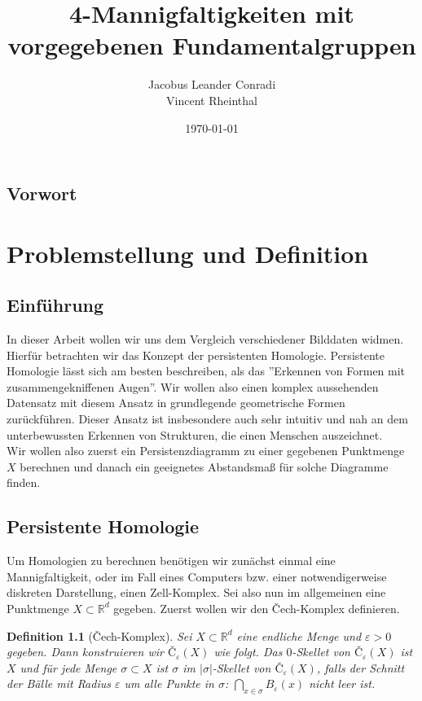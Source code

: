 \documentclass[11pt, a4paper,draft]{report}
\author{Jacobus Leander Conradi\\Vincent Rheinthal}
\date{\today}
\title{4-Mannigfaltigkeiten mit vorgegebenen Fundamentalgruppen}
\newtheorem{definition}{Definition}
\newcommand{\bR}{\mathbb{R}}
\begin{document}
 
	\maketitle
	
	\thispagestyle{plain}
	\section*{Vorwort}
	
	\newpage
	\clearpage
	\thispagestyle{empty}\mbox{}
	\newpage
	\addtocounter{page}{-1}
	\tableofcontents 
	\vfil\null
	\clearpage
	\thispagestyle{empty}\mbox{}
	\clearpage
	
	\chapter{Problemstellung und Definition}
	\section{Einführung}
	In dieser Arbeit wollen wir uns dem Vergleich verschiedener Bilddaten widmen. Hierfür betrachten wir das Konzept der persistenten Homologie. Persistente Homologie lässt sich am besten beschreiben, als das ''Erkennen von Formen mit zusammengekniffenen Augen''. Wir wollen also einen komplex aussehenden Datensatz mit diesem Ansatz in grundlegende geometrische Formen zurückführen. Dieser Ansatz ist insbesondere auch sehr intuitiv und nah an dem unterbewussten Erkennen von Strukturen, die einen Menschen auszeichnet.\\
	Wir wollen also zuerst ein Persistenzdiagramm zu einer gegebenen Punktmenge $X$ berechnen und danach ein geeignetes Abstandsmaß für solche Diagramme finden.
	
	\section{Persistente Homologie}
	
	Um Homologien zu berechnen benötigen wir zunächst einmal eine Mannigfaltigkeit, oder im Fall eines Computers bzw. einer notwendigerweise diskreten Darstellung, einen Zell-Komplex. Sei also nun im allgemeinen eine Punktmenge $X\subset \bR^d$ gegeben. Zuerst wollen wir den Čech-Komplex definieren.
	
	\begin{definition}[Čech-Komplex]
		Sei $X\subset \bR^d$ eine endliche Menge und $\varepsilon>0$ gegeben. Dann konstruieren wir $Č_\varepsilon(X)$ wie folgt. Das $0$-Skellet von $Č_\varepsilon(X)$ ist $X$ und für jede Menge $\sigma\subset X$ ist $\sigma$ im $|\sigma|$-Skellet von $Č_\varepsilon(X)$, falls der Schnitt der Bälle mit Radius $\varepsilon$ um alle Punkte in $\sigma$: $\bigcap_{x\in\sigma}B_\varepsilon(x)$ nicht leer ist.
	\end{definition}
\end{document}
